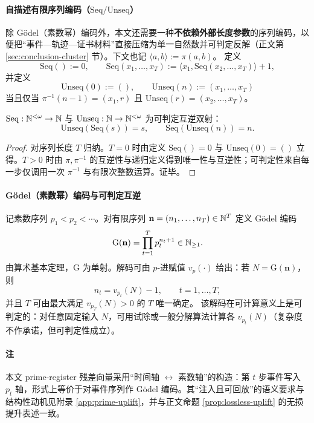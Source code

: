 \paragraph{自描述有限序列编码（\texorpdfstring{$\mathrm{Seq}/\mathrm{Unseq}$}{Seq/Unseq}）}
除 Gödel（素数幂）编码外，本文还需要一种\textbf{不依赖外部长度参数}的序列编码，以便把“事件—轨迹—证书材料”直接压缩为单一自然数并可判定反解（正文第 \ref{sec:conclusion-cluster} 节）。下文也记
$
\langle a,b\rangle:=\pi(a,b)
$。
定义
$$
\mathrm{Seq}():=0,\qquad
\mathrm{Seq}(x_1,\dots,x_T):=\langle x_1,\mathrm{Seq}(x_2,\dots,x_T)\rangle+1,
$$
并定义
$$
\mathrm{Unseq}(0):=(),\qquad
\mathrm{Unseq}(n):=(x_1,\dots,x_T)
$$
当且仅当 $\pi^{-1}(n-1)=(x_1,r)$ 且 $\mathrm{Unseq}(r)=(x_2,\dots,x_T)$。

\begin{proposition}[自描述序列的可判定互逆]\label{prop:seq-unseq-invertible}
$\mathrm{Seq}:\mathbb{N}^{<\omega}\to\mathbb{N}$ 与 $\mathrm{Unseq}:\mathbb{N}\to\mathbb{N}^{<\omega}$ 为可判定互逆双射：
$$
\mathrm{Unseq}(\mathrm{Seq}(s))=s,\qquad
\mathrm{Seq}(\mathrm{Unseq}(n))=n.
$$
\end{proposition}

\begin{proof}
对序列长度 $T$ 归纳。$T=0$ 时由定义 $\mathrm{Seq}()=0$ 与 $\mathrm{Unseq}(0)=()$ 立得。$T>0$ 时由 $\pi,\pi^{-1}$ 的互逆性与递归定义得到唯一性与互逆性；可判定性来自每一步仅调用一次 $\pi^{-1}$ 与有限次整数运算。证毕。
\end{proof}

\paragraph{Gödel（素数幂）编码与可判定互逆}
记素数序列 $p_1<p_2<\cdots$。对有限序列 $\mathbf n=(n_1,\dots,n_T)\in\mathbb{N}^T$ 定义 Gödel 编码
$$
\mathrm{G}(\mathbf n)=\prod_{t=1}^{T} p_t^{n_t+1}\in\mathbb{N}_{\ge 1}.
$$
由算术基本定理，$\mathrm{G}$ 为单射。解码可由 $p$-进赋值 $v_p(\cdot)$ 给出：若 $N=\mathrm{G}(\mathbf n)$，则
$$
n_t=v_{p_t}(N)-1,\qquad t=1,\dots,T,
$$
并且 $T$ 可由最大满足 $v_{p_T}(N)>0$ 的 $T$ 唯一确定。
该解码在可计算意义上是可判定的：对任意固定输入 $N$，可用试除或一般分解算法计算各 $v_{p_t}(N)$（复杂度不作承诺，但可判定性成立）。

\paragraph{注}
本文 prime-register 残差向量采用“时间轴 $\leftrightarrow$ 素数轴”的构造：第 $t$ 步事件写入 $p_t$ 轴，形式上等价于对事件序列作 Gödel 编码。其“注入且可回放”的语义要求与结构性动机见附录 \ref{app:prime-uplift}，并与正文命题 \ref{prop:lossless-uplift} 的无损提升表述一致。

